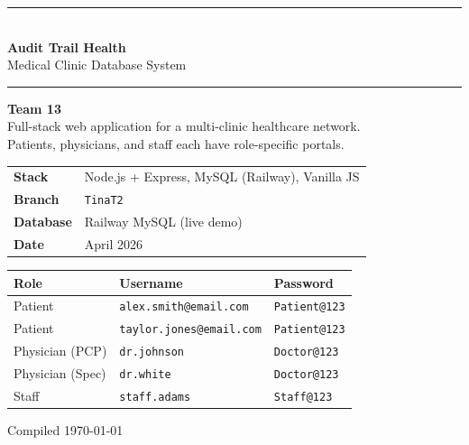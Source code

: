 \documentclass[12pt, letterpaper]{article}
\begin{document}
\begin{titlepage}
  \centering
  \vspace*{1.5cm}
  {\color{clinicBlue}\rule{\linewidth}{1.5pt}}\\[0.3cm]
  {\fontsize{26}{32}\selectfont\bfseries\color{clinicBlue}
    Audit Trail Health\\[0.15cm]}
  {\fontsize{14}{18}\selectfont\color{clinicGreen}
    Medical Clinic Database System}\\[0.3cm]
  {\color{clinicBlue}\rule{\linewidth}{1.5pt}}
  \vspace{1.2cm}

  {\large\bfseries Team 13}\\[0.4cm]
  {\normalsize
    Full-stack web application for a multi-clinic healthcare network.\\
    Patients, physicians, and staff each have role-specific portals.
  }

  \vspace{1.4cm}
  \begin{tabular}{ll}
    \textbf{Stack}    & Node.js + Express, MySQL (Railway), Vanilla JS \\
    \textbf{Branch}   & \texttt{TinaT2} \\
    \textbf{Database} & Railway MySQL (live demo) \\
    \textbf{Date}     & April 2026 \\
  \end{tabular}

  \vspace{1.8cm}
  \begin{greenbox}
  \small
  \begin{tabular}{lll}
    \toprule
    \textbf{Role} & \textbf{Username} & \textbf{Password} \\
    \midrule
    Patient          & \texttt{alex.smith@email.com}    & \texttt{Patient@123} \\
    Patient          & \texttt{taylor.jones@email.com}  & \texttt{Patient@123} \\
    Physician (PCP)  & \texttt{dr.johnson}              & \texttt{Doctor@123} \\
    Physician (Spec) & \texttt{dr.white}                & \texttt{Doctor@123} \\
    Staff            & \texttt{staff.adams}             & \texttt{Staff@123} \\
    \bottomrule
  \end{tabular}
  \end{greenbox}

  \vfill
  {\small\color{gray}Compiled \today}
\end{titlepage}
\end{document}
